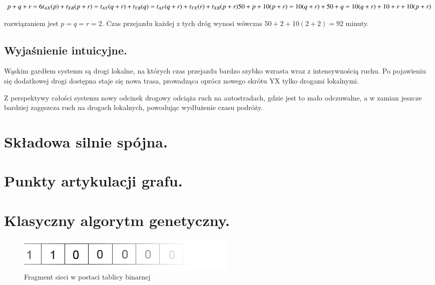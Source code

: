 \documentclass[twoside,12pt]{report}
\begin{document}
\begin{center}
\begin{math}
p+q+r = 6 \newline
t_{AX}(p)+t_{XB}(p+r) = t_{AY}(q+r) + t_{YB}(q) = t_{AY}(q+r)+t_{YX}(r)+t_{XB}(p+r)\newline
50+p+10(p+r) = 10(q+r)+50+q = 10(q+r)+ 10 + r + 10(p+r)\newline
\end{math}
\end{center}
rozwiązaniem jest $p=q=r=2$.
Czas przejazdu każdej z tych dróg wynosi wówczas $50+2+10(2+2)=92$ minuty.

\subsection{Wyjaśnienie intuicyjne.}
Wąskim gardłem systemu są drogi lokalne, na których czas przejazdu bardzo szybko wzrasta wraz z intensywnością ruchu. Po pojawieniu się dodatkowej drogi dostępna staje się nowa trasa, prowadząca oprócz nowego skrótu YX tylko drogami lokalnymi.

Z perspektywy całości systemu nowy odcinek drogowy odciąża ruch na autostradach, gdzie jest to mało odczuwalne, a w zamian jeszcze bardziej zagęszcza ruch na drogach lokalnych, powodując wydłużenie czasu podróży.

\section{Składowa silnie spójna.}


\section{Punkty artykulacji grafu.}


\section{Klasyczny algorytm genetyczny.}


\begin{figure}[ht]
\includegraphics[width=\textwidth]{img/bool}
\caption{Fragment sieci w postaci tablicy binarnej }
\end{figure}
\end{document}

